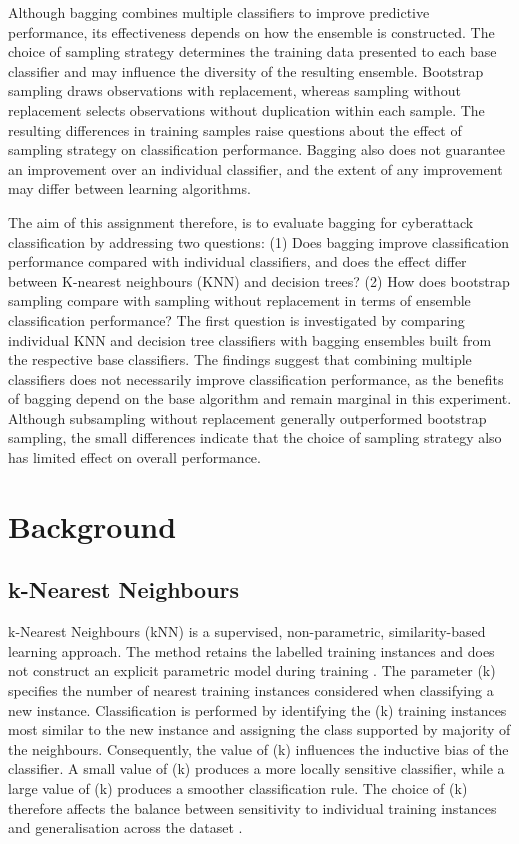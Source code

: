 \documentclass[conference, 10pt]{IEEEtran}
\begin{document}
Although bagging combines multiple classifiers to improve predictive performance, its effectiveness depends on 
how the ensemble is constructed. The choice of sampling strategy determines the training data presented to each 
base classifier and may influence the diversity of the resulting ensemble. Bootstrap sampling draws observations 
with replacement, whereas sampling without replacement selects observations without duplication within each sample. 
The resulting differences in training samples raise questions about the effect of sampling strategy on classification 
performance. Bagging also does not guarantee an improvement over an individual classifier, and the extent of any 
improvement may differ between learning algorithms.

The aim of this assignment therefore, is to evaluate bagging for cyberattack classification by addressing two questions: (1) 
Does bagging improve classification performance compared with individual classifiers, and does the effect differ 
between K-nearest neighbours (KNN) and decision trees? (2) How does bootstrap sampling compare with sampling 
without replacement in terms of ensemble classification performance? The first question is investigated by 
comparing individual KNN and decision tree classifiers with bagging ensembles built from the respective base 
classifiers. The findings suggest that combining multiple classifiers does not necessarily improve classification 
performance, as the benefits of bagging depend on the base algorithm and remain marginal in this experiment. 
Although subsampling without replacement generally outperformed bootstrap sampling, the small differences 
indicate that the choice of sampling strategy also has limited effect on overall performance.

\section{Background}

\subsection{k-Nearest Neighbours}

k-Nearest Neighbours (kNN) is a supervised, non-parametric, similarity-based learning approach. 
The method retains the labelled training instances and does not construct an explicit parametric 
model during training \cite{Cover1967}. The parameter (k) specifies the number of nearest training 
instances considered when classifying a new instance. Classification is performed by identifying the 
(k) training instances most similar to the new instance and assigning the class supported by majority of the 
neighbours. Consequently, the value of (k) influences the inductive bias of the classifier. 
A small value of (k) produces a more locally sensitive classifier, while a large value of (k) 
produces a smoother classification rule. The choice of (k) therefore affects the balance between 
sensitivity to individual training instances and generalisation across the dataset \cite{GarciaPedrajas2017}.
\end{document}
